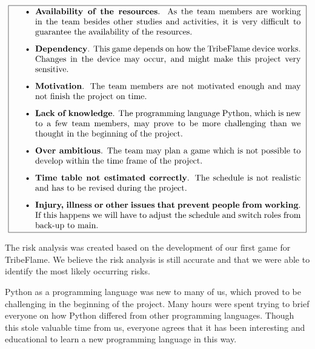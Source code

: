 \documentclass[12pt,a4paper]{article}
\begin{document}
\[
\fbox{
\addtolength{\linewidth}{-2\fboxsep}%
\addtolength{\linewidth}{-2\fboxrule}%
\begin{minipage}{\linewidth}
\begin{itemize}
\item {\bf Availability of the resources}. As the team members are working in the team besides other studies and activities, it is very difficult to guarantee the availability of the resources.
\item {\bf Dependency}. This game depends on how the TribeFlame device works. Changes in the device may occur, and might make this project very sensitive.
\item {\bf Motivation}. The team members are not motivated enough and may not finish the project on time.
\item {\bf Lack of knowledge}. The programming language Python, which is new to a few team members, may prove to be more challenging than we thought in the beginning of the project.
\item {\bf Over ambitious}. The team may plan a game which is not possible to develop within the time frame of the project.
\item {\bf Time table not estimated correctly}. The schedule is not realistic and has to be revised during the project.
\item {\bf Injury, illness or other issues that prevent people from working}. If this happens we will have to adjust the schedule and switch roles from back-up to main.
\end{itemize}
\end{minipage}
}
\]

The risk analysis was created based on the development of our first game for TribeFlame. We believe the risk analysis is still accurate and that we were able to identify the most likely occurring risks.

Python as a programming language was new to many of us, which proved to be challenging in the beginning of the project. Many hours were spent trying to brief everyone on how Python differed from other programming languages. Though this stole valuable time from us, everyone agrees that it has been interesting and educational to learn a new programming language in this way.
\end{document}
